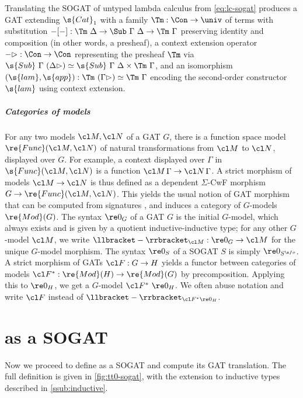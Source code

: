 \documentclass[a4paper,UKenglish,cleveref,autoref,thm-restate]{lipics-v2021}
\begin{document}
\begin{example}\label{ex:lc-fo} Translating the SOGAT of untyped lambda calculus
from \cref{eq:lc-sogat} produces a GAT extending $\s{Cat}_1$ with a family $\Tm
: \Con \to \univ$ of terms with substitution $-[-] : \Tm\ \Delta \to \Sub\
\Gamma\ \Delta \to \Tm\ \Gamma$ preserving identity and composition (in other
words, a presheaf), a context extension operator $-\rhd : \Con \to \Con$
representing the presheaf $\Tm$ via $\s{Sub}\ \Gamma\ (\Delta \rhd) \simeq
\s{Sub}\ \Gamma\ \Delta \times \Tm\ \Gamma$, and an isomorphism $(\s{lam},
\s{app}) : \Tm\ (\Gamma \rhd) \simeq \Tm\ \Gamma$ encoding the second-order
constructor $\s{lam}$ using context extension.
\end{example}

\subparagraph{Categories of models}

For any two models $\cl M, \cl N$ of a GAT $G$, there is a function space model
$\re{Func}(\cl M, \cl N)$ of natural transformations from $\cl M$ to $\cl N$,
displayed over $G$. For example, a context displayed over $\Gamma$ in
$\s{Func}(\cl M, \cl N)$ is a function $\cl M\, \Gamma \to \cl N\, \Gamma$. A
strict morphism of models $\cl M \to \cl N$ is thus defined as a dependent
$\Sigma$-CwF morphism $G \to \re{Func}(\cl M, \cl N)$. This yields the usual
notion of GAT morphism that can be computed from signatures
\cite{Kovacs2023-gq}, and induces a category of $G$-models $\re{Mod}(G)$. The
syntax $\re 0_G$ of a GAT $G$ is the initial $G$-model, which always exists and
is given by a quotient inductive-inductive type; for any other $G$-model $\cl
M$, we write $\llbracket-\rrbracket_{\cl M} : \re 0_G \to \cl M$ for the unique
$G$-model morphism. The syntax $\re 0_S$ of a SOGAT $S$ is simply $\re 0_{S^{\s
fo}}$. A strict morphism\label{rem:morphisms} of GATs $\cl F : G \to H$ yields a
functor between categories of models $\cl F^* : \re{Mod}(H) \to \re{Mod}(G)$ by
precomposition. Applying this to $\re 0_H$, we get a
$G$-model $\cl F^*\ \re 0_H$. We often abuse notation and write $\cl F$ instead of $\llbracket - \rrbracket_{\cl F^* \re 0_H}$.

\section{\ZTT as a SOGAT}\label{sec:itt-sogat}

Now we proceed to define \ZTT as a SOGAT and compute its GAT translation. The
full definition is given in \cref{fig:tt0-sogat}, with the extension to
inductive types described in \cref{ssub:inductive}.
\end{document}
